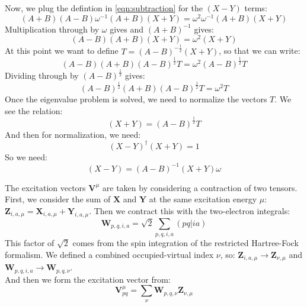 \documentclass[12pt]{caltech_thesis}
\begin{document}
Now, we plug the defintion in \ref{eqn:subtraction} for the $(X-Y)$ terms:
\begin{equation}
    (A+B)(A-B)\omega^{-1}(A+B)(X+Y) = \omega^2 \omega^{-1}(A+B)(X+Y)
\end{equation}
Multiplication through by $\omega$ gives and $(A+B)^{-1}$ gives:
\begin{equation}
    (A-B)(A+B)(X+Y) = \omega^{2} (X+Y)
\end{equation}
At this point we want to define $T=(A-B)^{-\frac{1}{2}}(X+Y)$, so that we can write:
\begin{equation}
    (A-B)(A+B)(A-B)^{\frac{1}{2}}T = \omega^{2} (A-B)^{\frac{1}{2}}T
\end{equation}
Dividing through by $(A-B)^{\frac{1}{2}}$ gives:
\begin{equation}
    (A-B)^{\frac{1}{2}}(A+B)(A-B)^{\frac{1}{2}}T = \omega^{2} T
\end{equation}
Once the eigenvalue problem is solved, we need to normalize the vectors $T$. We see the relation:
\begin{equation}
    (X+Y) = (A-B)^{\frac{1}{2}}T
\end{equation}
And then for normalization, we need:
\begin{equation}
    (X-Y)^{\dag}(X+Y)=1
\end{equation}
So we need:
\begin{equation}
    (X-Y)=(A-B)^{-1}(X+Y)\omega 
\end{equation}


The excitation vectors $\textbf{V}^{\mu}$ are taken by considering a contraction of two tensors. First, we consider the sum of $\textbf{X}$ and $\textbf{Y}$ at the same excitation energy $\mu$: $\textbf{Z}_{i,a,\mu} = \textbf{X}_{i,a,\mu} + \textbf{Y}_{i,a,\mu}$. Then we contract this with the two-electron integrals:
\begin{equation}
    \textbf{W}_{p,q,i,a} = \sqrt{2} \sum_{p,q,i,a} (pq|ia)
\end{equation}
This factor of $\sqrt{2}$ comes from the spin integration of the restricted Hartree-Fock formalism.
We defined a combined occupied-virtual index $\nu$, so: $\textbf{Z}_{i,a,\mu} \rightarrow \textbf{Z}_{\nu, \mu}$ and $\textbf{W}_{p,q,i,a}\rightarrow \textbf{W}_{p,q,\nu}$.\\

And then we form the excitation vector from:
\begin{equation}
    \textbf{V}_{pq}^{\mu} = \sum_{\nu} \textbf{W}_{p,q,\nu}\textbf{Z}_{\nu, \mu}
\end{equation}
\end{document}
